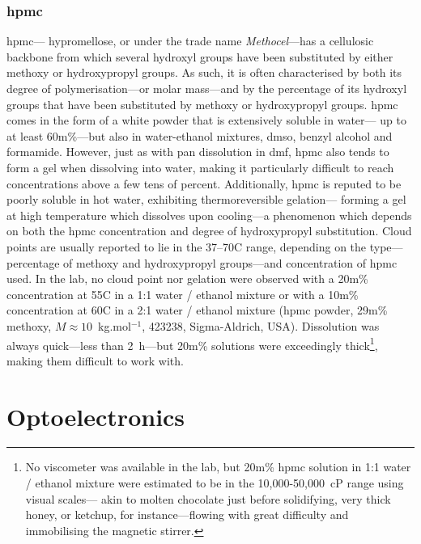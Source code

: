 \subsubsection{\texorpdfstring{\gls{hpmc}}{HPMC}}\label{subsect:thin_film:poly_hpmc}

\gls{hpmc}---\aka{} hypromellose, or under the trade name \textit{Methocel}---has a cellulosic backbone from which several hydroxyl groups have been substituted by either methoxy or hydroxypropyl groups\cite[Fig.~1]{li2005}. As such, it is often characterised by both its degree of polymerisation---or molar mass---and by the percentage of its hydroxyl groups that have been substituted by methoxy or hydroxypropyl groups\cite[Table~I]{archer1991}. \gls{hpmc} comes in the form of a white powder that is extensively soluble in water---\ie{} up to at least 60m\%\cite{pekel2004}---but also in water-ethanol mixtures\cite{fernandezramos2019}, \gls{dmso}, benzyl alcohol and formamide\cite{archer1991}. However, just as with \gls{pan} dissolution in \gls{dmf}, \gls{hpmc} also tends to form a gel when dissolving into water\cite{li2005}, making it particularly difficult to reach concentrations above a few tens of percent. Additionally, \gls{hpmc} is reputed to be poorly soluble in hot water, exhibiting thermoreversible gelation---\ie{} forming a gel at high temperature which dissolves upon cooling---a phenomenon which depends on both the \gls{hpmc} concentration and degree of hydroxypropyl substitution\cite{ford1999}. Cloud points are usually reported to lie in the 37--70{\degree}C range, depending on the type---\ie{} percentage of methoxy and hydroxypropyl groups---and concentration of \gls{hpmc} used. In the lab, no cloud point nor gelation were observed with a 20m\% concentration at 55{\degree}C in a 1:1 water / ethanol mixture or with a 10m\% concentration at 60{\degree}C in a 2:1 water / ethanol mixture (\gls{hpmc} powder, 29m\% methoxy, $M \approx 10$~kg.mol$^{-1}$, 423238, Sigma-Aldrich, USA). Dissolution was always quick---less than 2~h---but 20m\% solutions were exceedingly thick\footnote{No viscometer was available in the lab, but 20m\% \gls{hpmc} solution in 1:1 water / ethanol mixture were estimated to be in the 10,000-50,000~cP range using visual scales---\ie{} akin to molten chocolate just before solidifying, very thick honey, or ketchup, for instance---flowing with great difficulty and immobilising the magnetic stirrer.}, making them difficult to work with.

\section{Optoelectronics}\label{sect:thin_film:opto_elec}

